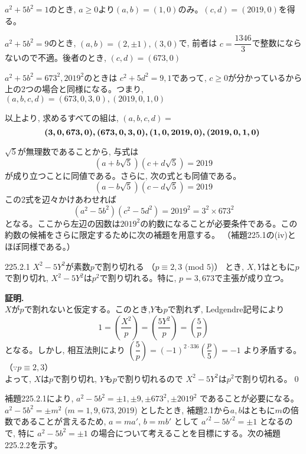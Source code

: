 $a^2+5b^2=1$のとき, $a\geq 0 $より$(a,b)=(1,0)$のみ。$(c,d)=(2019,0)$を得る。

$a^2+5b^2=9$のとき, $(a,b)=(2,\pm 1), (3,0)$で, 前者は $c=\dfrac{1346}{3}$で整数にならないので不適。後者のとき, $(c,d)=(673, 0)$

$a^2+5b^2=673^2, 2019^2$のときは $c^2+5d^2=9,1$であって, $c\geq 0$が分かっているから上の2つの場合と同様になる。つまり, $(a,b,c,d)=(673,0,3,0), (2019,0,1,0)$

以上より, 求めるすべての組は, $(a,b,c,d)=$
\[\mbox{{\boldmath  $(3,0,673,0),(673,0,3,0),(1,0,2019,0),(2019,0,1,0)$} }\]

$\sqrt{5}$が無理数であることから, 与式は
\[(a+b\sqrt{5})(c+d\sqrt{5})=2019\]
が成り立つことに同値である。さらに, 次の式とも同値である。
\[(a-b\sqrt{5})(c-d\sqrt{5})=2019\]
この2式を辺々かけあわせれば
\[(a^2-5b^2)(c^2-5d^2)=2019^2=3^2\times 673^2\]
となる。ここから左辺の因数は$2019^2$の約数になることが必要条件である。この約数の候補をさらに限定するために次の補題を用意する。 （補題225.1の(iv)とほぼ同様である。）

\begin{subthm}{225.2.1}
 $X^2-5Y^2$が素数$p$で割り切れる （$p\equiv 2,3$ (mod $5$)） とき, $X,Y$はともに$p$で割り切れ, $X^2-5Y^2$は$p^2$で割り切れる。特に, $p=3,673$で主張が成り立つ。
\end{subthm}

{\bf 証明.}\\
$X$が$p$で割れないと仮定する。このとき,$Y$も$p$で割れず, Ledgendre記号により
\[1=\left(\dfrac{X^2}{p}\right)=\left(\dfrac{5Y^2}{p}\right)=\left(\dfrac{5}{p}\right)\]
となる。しかし, 相互法則により $\left(\dfrac{5}{p}\right)=(-1)^{2\cdot 336}\left(\dfrac{p}{5}\right)=-1$ より矛盾する。（$\because p\equiv 2,3$）\\
よって, $X$は$p$で割り切れ, $Y$も$p$で割り切れるので $X^2-5Y^2$は$p^2$で割り切れる。\qed

補題225.2.1により, $a^2-5b^2=\pm 1, \pm 9, \pm 673^2, \pm 2019^2$ であることが必要になる。$a^2-5b^2=\pm m^2$ ($m=1,9,673,2019$) としたとき, 補題2.1から$a,b$はともに$m$の倍数であることが言えるため, $a=ma'$, $b=mb'$ として $a'^2-5b'^2=\pm 1$ となるので, 特に $a^2-5b^2=\pm 1$ の場合について考えることを目標にする。次の補題225.2.2を示す。

